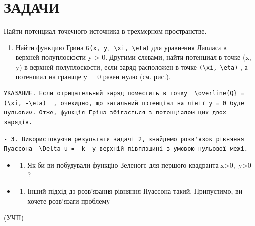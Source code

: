 \documentclass[
  ukrainian,
]{article}
\providecommand{\tightlist}{%
  \setlength{\itemsep}{0pt}\setlength{\parskip}{0pt}}
\begin{document}
\section{ЗАДАЧИ}\label{ux437ux430ux434ux430ux447ux438-4}

Найти потенциал точечного источника в трехмерном пространстве.

\begin{enumerate}
\def\labelenumi{\arabic{enumi}.}
\setcounter{enumi}{1}
\tightlist
\item
  Найти функцию Грина
  \texttt{G(x,\ y,\ \textbackslash{}xi,\ \textbackslash{}eta)} для
  уравнения Лапласа в верхней полуплоскости y \textgreater{} 0. Другими
  словами, найти потенциал в точке (x, y) в верхней полуплоскости, если
  заряд расположен в точке
  \texttt{(\textbackslash{}xi,\ \textbackslash{}eta)} , а потенциал на
  границе y = 0 равен нулю (см. рис.).
\end{enumerate}

\begin{verbatim}
УКАЗАНИЕ. Если отрицательный заряд поместить в точку  \overline{Q} = (\xi, -\eta)  , очевидно, що загальний потенціал на лінії y = 0 буде нульовим. Отже, функція Гріна збігається з потенціалом цих двох зарядів.
\end{verbatim}

\begin{verbatim}
- 3. Використовуючи результати задачі 2, знайдемо розв'язок рівняння Пуассона  \Delta u = -k  у верхній півплощині з умовою нульової межі.
\end{verbatim}

\begin{itemize}
\tightlist
\item
  \begin{enumerate}
  \def\labelenumi{\arabic{enumi}.}
  \setcounter{enumi}{3}
  \tightlist
  \item
    Як би ви побудували функцію Зеленого для першого квадранта
    x\textgreater0,~y\textgreater0 ?
  \end{enumerate}
\item
  \begin{enumerate}
  \def\labelenumi{\arabic{enumi}.}
  \setcounter{enumi}{4}
  \tightlist
  \item
    Інший підхід до розв'язання рівняння Пуассона такий. Припустимо, ви
    хочете розв'язати проблему
  \end{enumerate}
\end{itemize}

(УЧП)
\end{document}
